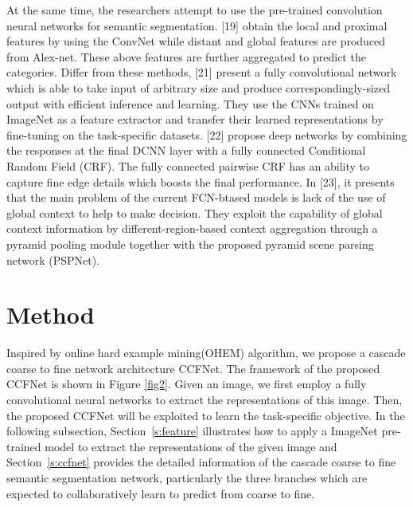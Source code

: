 \documentclass[10.5pt,compsoc]{TsT}
\newcommand{\upcite}[1]{\superscript{\textsuperscript{\cite{#1}}}}
\theoremstyle{mystyle}
\newcommand{\upcite}[1]{\textsuperscript{\cite{#1}}}
\begin{document}
{At the same time, the researchers attempt to use the pre-trained convolution neural networks for semantic segmentation. [19] obtain the local and proximal features by using the ConvNet while distant and global features are produced from Alex-net\upcite{20}. These above features are further aggregated to predict the categories. Differ from these methods, [21] present a fully convolutional network which is able to take input of arbitrary size and produce correspondingly-sized output with efficient inference and learning. They use the CNNs trained on ImageNet as a feature extractor and transfer their learned representations by fine-tuning on the task-specific datasets. [22] propose deep networks by combining the responses at the final DCNN layer with a fully connected Conditional Random Field (CRF). The fully connected pairwise CRF has an ability to capture fine edge details which boosts the final performance. In [23], it presents that the main problem of the current FCN-btased models is lack of the use of global context to help to make decision. They exploit the capability of global context information by different-region-based context aggregation through a pyramid pooling module together with the proposed pyramid scene parsing network (PSPNet).



\section{Method}
\label{s:Method}
\noindent


Inspired by online hard example mining(OHEM) algorithm, we propose a cascade coarse to fine network architecture CCFNet. The framework of the proposed CCFNet is shown in Figure \ref{fig2}. Given an image, we first employ a fully convolutional neural networks to extract the representations of this image. Then, the proposed CCFNet will be exploited to learn the task-specific objective. In the following subsection, Section~\ref{s:feature} illustrates how to apply a ImageNet pre-trained model to extract the representations of the given image and Section~\ref{s:ccfnet} provides the detailed information of the cascade coarse to fine semantic segmentation network, particularly the three branches which are expected to collaboratively learn to predict from coarse to fine.


}
\end{document}
